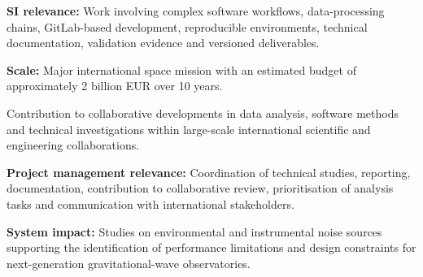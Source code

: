 \documentclass[8pt,a4paper,ragged2e,withhyper]{altacv}
\begin{document}
\textbf{SI relevance:} Work involving complex software workflows, data-processing chains, GitLab-based development, reproducible environments, technical documentation, validation evidence and versioned deliverables.

\textbf{Scale:} Major international space mission with an estimated budget of approximately 2 billion EUR over 10 years.

\divider


Contribution to collaborative developments in data analysis, software methods and technical investigations within large-scale international scientific and engineering collaborations.

\textbf{Project management relevance:} Coordination of technical studies, reporting, documentation, contribution to collaborative review, prioritisation of analysis tasks and communication with international stakeholders.

\textbf{System impact:} Studies on environmental and instrumental noise sources supporting the identification of performance limitations and design constraints for next-generation gravitational-wave observatories.


\vspace{-.3cm}


{\small
{}
}

\divider\smallskip
\vspace{-.3cm}
\newpage


{\small
{}
}
\end{document}
